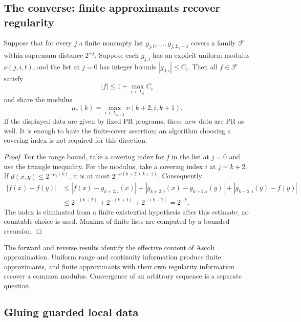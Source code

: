 \subsection{The converse: finite approximants recover regularity}

\begin{proposition}\label{prop:ascoli-converse}
Suppose that for every $j$ a finite nonempty list
$g_{j,0},\ldots,g_{j,L_j-1}$ covers a family $\mathcal F$ within
supremum distance $2^{-j}$.  Suppose each $g_{j,i}$ has an explicit
uniform modulus $\nu(j,i,t)$, and the list at $j=0$ has integer bounds
$|g_{0,i}|\le C_i$.  Then all $f\in\mathcal F$ satisfy
\[
 |f|\le1+\max_{i<L_0}C_i
\]
and share the modulus
\begin{equation}\label{eq:ascoli-converse-modulus}
 \mu_*(k)=\max_{i<L_{k+2}}\nu(k+2,i,k+1).
\end{equation}
If the displayed data are given by fixed PR programs, these new data
are PR as well.  It is enough to have the finite-cover assertion;
an algorithm choosing a covering index is not required for this
direction.
\end{proposition}

\begin{proof}
For the range bound, take a covering index for $f$ in the list at
$j=0$ and use the triangle inequality.  For the modulus, take a
covering index $i$ at $j=k+2$.  If
$d(x,y)\le2^{-\mu_*(k)}$, it is at most
$2^{-\nu(k+2,i,k+1)}$.  Consequently
\begin{align*}
 |f(x)-f(y)|
 &\le |f(x)-g_{k+2,i}(x)|
   +|g_{k+2,i}(x)-g_{k+2,i}(y)|
   +|g_{k+2,i}(y)-f(y)|\\
 &\le 2^{-(k+2)}+2^{-(k+1)}+2^{-(k+2)}=2^{-k}.
\end{align*}
The index is eliminated from a finite existential hypothesis after
this estimate; no countable choice is used.  Maxima of finite lists
are computed by a bounded recursion.
\end{proof}

The forward and reverse results identify the effective content of
Ascoli approximation.  Uniform range and continuity information
produce finite approximants, and finite approximants with their own
regularity information recover a common modulus.  Convergence of an
arbitrary sequence is a separate question.

\subsection{Gluing guarded local data}

